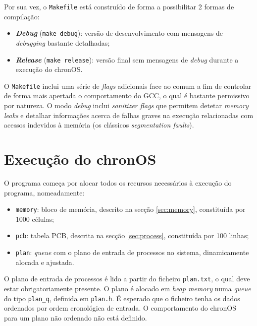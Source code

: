\documentclass[a4paper,11pt,onecolumn,oneside]{article}
\newcommand{\chronOS}{\textsf{chronOS}}
\begin{document}
	Por sua vez, o \texttt{Makefile} está construído de forma a possibilitar 2 formas de compilação:
	
	\begin{itemize}
		\item \textbf{\textit{Debug}} (\verb|make debug|): versão de desenvolvimento com mensagens de \textit{debugging} bastante detalhadas;
		
		\item \textbf{\textit{Release}} (\verb|make release|): versão final sem mensagens de \textit{debug} durante a execução do \chronOS.
	\end{itemize}

	O \texttt{Makefile} inclui uma série de \textit{flags} adicionais face ao comum a fim de controlar de forma mais apertada o comportamento do \ac{GCC}, o qual é bastante permissivo por natureza. O modo \textit{debug} inclui \textit{sanitizer flags} que permitem detetar \textit{memory leaks} e detalhar informações acerca de falhas graves na execução relacionadas com acessos indevidos à memória (os clássicos \textit{segmentation faults}).
	
	
	\section{Execução do \chronOS}
	\label{sec:main}
	
	O programa começa por alocar todos os recursos necessários à execução do programa, nomeadamente:
	
	\begin{itemize}
		\item \verb|memory|: bloco de memória, descrito na secção \ref{sec:memory}, constituída por 1000 células;
		\item \verb|pcb|: tabela \ac{PCB}, descrita na secção \ref{sec:process}, constituída por 100 linhas;
		\item \verb|plan|: \textit{queue} com o plano de entrada de processos no sistema, dinamicamente alocada e ajustada.
	\end{itemize}

	O plano de entrada de processos é lido a partir do ficheiro \texttt{plan.txt}, o qual deve estar obrigatoriamente presente. O plano é alocado em \textit{heap memory} numa \textit{queue} do tipo \verb|plan_q|, definida em \verb|plan.h|. É esperado que o ficheiro tenha os dados ordenados por ordem cronológica de entrada. O comportamento do \chronOS~ para um plano não ordenado não está definido.
	
\end{document}

